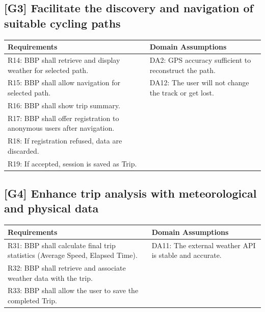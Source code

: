 \subsection*{[G3] Facilitate the discovery and navigation of suitable cycling paths}
\begin{longtable}{|L{0.47\textwidth}|L{0.47\textwidth}|}
\hline
\textbf{Requirements} & \textbf{Domain Assumptions} \\ \hline
R14: BBP shall retrieve and display weather for selected path. & DA2: GPS accuracy sufficient to reconstruct the path. \\ \hline
R15: BBP shall allow navigation for selected path. & DA12: The user will not change the track or get lost. \\ \hline
R16: BBP shall show trip summary. & \\ \hline
R17: BBP shall offer registration to anonymous users after navigation. & \\ \hline
R18: If registration refused, data are discarded. & \\ \hline
R19: If accepted, session is saved as Trip. & \\ \hline
\end{longtable}

\subsection*{[G4] Enhance trip analysis with meteorological and physical data}
\begin{longtable}{|L{0.47\textwidth}|L{0.47\textwidth}|}
\hline
\textbf{Requirements} & \textbf{Domain Assumptions} \\ \hline
R31: BBP shall calculate final trip statistics (Average Speed, Elapsed Time). & DA11: The external weather API is stable and accurate. \\ \hline
R32: BBP shall retrieve and associate weather data with the trip. & \\ \hline
R33: BBP shall allow the user to save the completed Trip. & \\ \hline
\end{longtable}

